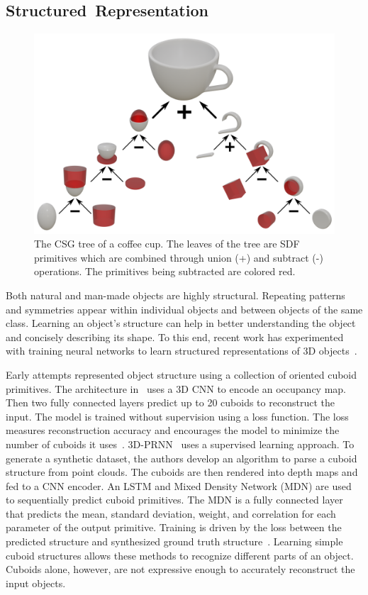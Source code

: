 \newpage


\subsection{Structured~Representation}
\label{subsec:structured_representation}

\begin{figure}[ht]
	\centering
	\includegraphics[scale=0.5]{Images/CSG Cup}
	\caption{The CSG tree of a coffee cup. The leaves of the tree are SDF primitives which are combined through union (+) and subtract (-) operations. The primitives being subtracted are colored red.}
	\label{fig:csg_cup}
\end{figure}

Both natural and man-made objects are highly structural. Repeating patterns and symmetries appear within individual objects and between objects of the same class. Learning an object's structure can help in better understanding the object and concisely describing its shape. To this end, recent work has experimented with training neural networks to learn structured representations of 3D objects~\cite{Tulsiani2017}.

Early attempts represented object structure using a collection of oriented cuboid primitives. The architecture in~\cite{Tulsiani2017} uses a 3D CNN to encode an occupancy map. Then two fully connected layers predict up to 20 cuboids to reconstruct the input. The model is trained without supervision using a loss function. The loss measures reconstruction accuracy and encourages the model to minimize the number of cuboids it uses~\cite{Tulsiani2017}. 3D-PRNN~\cite{Zou2017} uses a supervised learning approach. To generate a synthetic dataset, the authors develop an algorithm to parse a cuboid structure from point clouds. The cuboids are then rendered into depth maps and fed to a CNN encoder. An LSTM and Mixed Density Network (MDN) are used to sequentially predict cuboid primitives. The MDN is a fully connected layer that predicts the mean, standard deviation, weight, and correlation for each parameter of the output primitive. Training is driven by the loss between the predicted structure and synthesized ground truth structure~\cite{Zou2017}. Learning simple cuboid structures allows these methods to recognize different parts of an object. Cuboids alone, however, are not expressive enough to accurately reconstruct the input objects.

